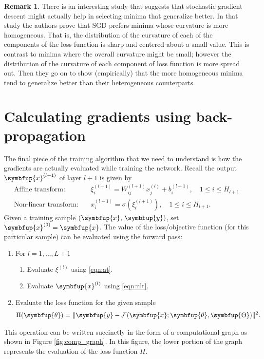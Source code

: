 \documentclass[11pt]{extarticle}
\newcommand{\vx}{\symbfup{x}}
\newcommand{\vy}{\symbfup{y}}
\theoremstyle{definition}
\newcommand{\btheta}{\symbfup{\theta}}
\newcommand{\Hp}{\symbfup{\Theta}}
\newtheorem{remark}{Remark}%
\begin{document}
\begin{remark}
There is an interesting study \cite{WuSGD} that suggests that stochastic gradient descent might actually help in selecting minima that generalize better. In that study the authors prove that SGD prefers minima whose curvature is more homogeneous. That is, the distribution of the curvature of each of the components of the loss function is sharp and centered about a small value. This is contrast to minima where the overall curvature might be small; however the distribution of the curvature of each component of loss function is more spread out. Then they go on to show (empirically) that the more homogeneous minima tend to generalize better than their heterogeneous counterparts. 

\end{remark}

\section*{Calculating gradients using back-propagation} \label{sec:backprop}
The final piece of the training algorithm that we need to understand is how the gradients are actually evaluated while training the network. Recall the output $\vx^{(l+1)}$ of layer $l+1$ is given by
\begin{align}
  \text{Affine transform:} & \quad \xi^{(l+1)}_i= W_{ij}^{(l+1)} x_j^{(l)}+ b_i^{(l+1)}, \quad 1 \leqslant i \leqslant H_{l+1} \label{eqn:at}\\
  \text{Non-linear transform:} & \quad x^{(l+1)}_i = \sigma\left(\xi^{(l+1)}_i\right), \quad 1 \leqslant i \leqslant H_{l+1} \label{eqn:nlt}. 
\end{align}
Given a training sample $(\vx,\,\vy)$, set $\vx^{(0)} = \vx$. The value of the loss/objective function (for this particular sample) can be evaluated using the forward pass:
\begin{enumerate}
  \item For $l = 1, ..., L+1$
    \begin{enumerate}
      \item Evaluate $\xi^{(l)}$ using \eqref{eqn:at}.
      \item Evaluate $\vx^{(l)}$ using \eqref{eqn:nlt}.
    \end{enumerate}
  \item Evaluate the loss function for the given sample 
    \begin{align*}
      \Pi(\btheta) =\|\vy - \mathcal{F}(\vx; \btheta, \Hp)\|^2.
    \end{align*}   
\end{enumerate}
This operation can be written succinctly in the form of a computational graph as shown in Figure \ref{fig:comp_graph}. In this figure, the lower portion of the graph represents the evaluation of the loss function $\Pi$. 
\end{document}
